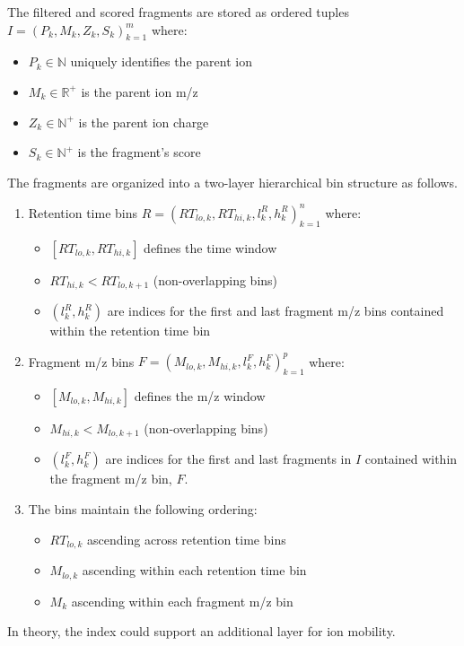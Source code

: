 \documentclass[pdflatex,sn-nature]{sn-jnl}
\begin{document}
The filtered and scored fragments are stored as ordered tuples $I = {(P_k, M_k, Z_k, S_k)}_{k=1}^m$ where:

\begin{itemize}
\item $P_k \in \mathbb{N}$ uniquely identifies the parent ion
\item $M_k \in \mathbb{R}^+$ is the parent ion m/z
\item $Z_k \in  \mathbb{N}^+$ is the parent ion charge
\item $S_k \in \mathbb{N}^+$ is the fragment's score
\end{itemize}

The fragments are organized into a two-layer hierarchical bin structure as follows.

\begin{enumerate}
\item Retention time bins $R = {(RT_{lo,k}, RT_{hi,k}, l_k^R, h_k^R)}_{k=1}^n$ where:
    \begin{itemize} 
        \item $[RT_{lo,k}, RT_{hi,k}]$ defines the time window
        \item $RT_{hi,k} < RT_{lo,k+1}$ (non-overlapping bins)
        \item $(l_k^R, h_k^R)$ are indices for the first and last fragment m/z bins contained within the retention time bin
    \end{itemize}
\item Fragment m/z bins $F = {(M_{lo,k}, M_{hi,k}, l_k^F, h_k^F)}_{k=1}^p$ where:
    \begin{itemize} 
        \item $[M_{lo,k}, M_{hi,k}]$ defines the m/z window
        \item $M_{hi,k} < M_{lo,k+1}$ (non-overlapping bins)
        \item $(l_k^F, h_k^F)$ are indices for the first and last fragments in $I$ contained within the fragment m/z bin, $F$. 
    \end{itemize}
\item The bins maintain the following ordering:
    \begin{itemize}
        \item $RT_{lo,k}$ ascending across retention time bins
        \item $M_{lo,k}$ ascending within each retention time bin
        \item $M_k$ ascending within each fragment m/z bin
    \end{itemize}
\end{enumerate}
In theory, the index could support an additional layer for ion mobility. 
\end{document}
